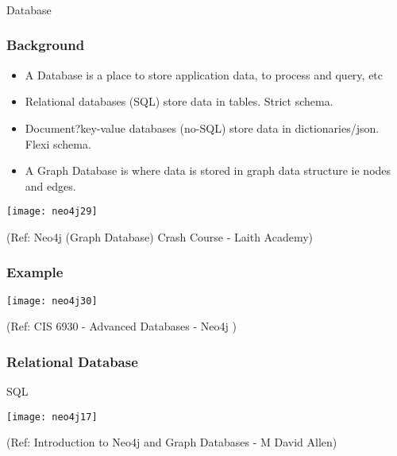 \begin{frame}[fragile]\frametitle{}
\begin{center}
{\Large Database}
\end{center}
\end{frame}


\begin{frame}\frametitle{Background}

\begin{itemize}
\item A Database is a place to store application data, to process and query, etc

\item Relational databases (SQL) store data in tables. Strict schema.
\item Document?key-value databases (no-SQL) store data in dictionaries/json. Flexi schema.
\item A Graph Database is where data is stored in graph data structure ie nodes and edges.
\end{itemize}

\begin{center}
\texttt{[image: neo4j29]}
\end{center}	

{\tiny (Ref: Neo4j (Graph Database) Crash Course - Laith Academy)}
\end{frame}

\begin{frame}\frametitle{Example}


\begin{center}
\texttt{[image: neo4j30]}
\end{center}	

{\tiny (Ref: CIS 6930 - Advanced Databases - Neo4j )}
\end{frame}

\begin{frame}[fragile]\frametitle{Relational Database}
SQL

\begin{center}
\texttt{[image: neo4j17]}
\end{center}	    

{\tiny (Ref: Introduction to Neo4j and Graph Databases
 - M David Allen)}

\end{frame}

